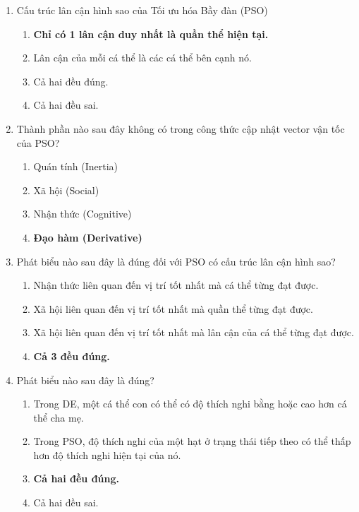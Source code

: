 \documentclass{book}
\begin{document}
\begin{enumerate}
    \item Cấu trúc lân cận hình sao của Tối ưu hóa Bầy đàn (PSO)
    \begin{multicols}{2}
        \begin{enumerate}[label=\Alph*]
            \item \textbf{Chỉ có 1 lân cận duy nhất là quần thể hiện tại.}
            \item Lân cận của mỗi cá thể là các cá thể bên cạnh nó.
            \item Cả hai đều đúng.
            \item Cả hai đều sai.
        \end{enumerate}
    \end{multicols}

    \item Thành phần nào sau đây không có trong công thức cập nhật vector vận tốc của PSO?
    \begin{multicols}{2}
        \begin{enumerate}[label=\Alph*]
            \item Quán tính (Inertia)
            \item Xã hội (Social)
            \item Nhận thức (Cognitive)
            \item \textbf{Đạo hàm (Derivative)}
        \end{enumerate}
    \end{multicols}

    \item Phát biểu nào sau đây là đúng đối với PSO có cấu trúc lân cận hình sao?
    \begin{multicols}{2}
        \begin{enumerate}[label=\Alph*]
            \item Nhận thức liên quan đến vị trí tốt nhất mà cá thể từng đạt được.
            \item Xã hội liên quan đến vị trí tốt nhất mà quần thể từng đạt được.
            \item Xã hội liên quan đến vị trí tốt nhất mà lân cận của cá thể từng đạt được.
            \item \textbf{Cả 3 đều đúng.}
        \end{enumerate}
    \end{multicols}

    \item Phát biểu nào sau đây là đúng?
    \begin{multicols}{2}
        \begin{enumerate}[label=\Alph*]
            \item Trong DE, một cá thể con có thể có độ thích nghi bằng hoặc cao hơn cá thể cha mẹ.
            \item Trong PSO, độ thích nghi của một hạt ở trạng thái tiếp theo có thể thấp hơn độ thích nghi hiện tại của nó.
            \item \textbf{Cả hai đều đúng.}
            \item Cả hai đều sai.
        \end{enumerate}
    \end{multicols}

\end{enumerate}
\end{document}
